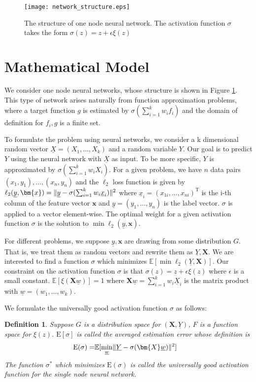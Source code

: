 \documentclass[conference]{IEEEtran}
\newtheorem{definition}{Definition}
\DeclarePairedDelimiter\norm{\lVert}{\rVert}
\def\E{\mathbb{E}}
\def\T{\mathrm{T}}
\begin{document}
\begin{figure}\label{fig:ns}
\texttt{[image: network\_structure.eps]}
\caption{The structure of one node neural network. The activation function $\sigma$ takes the form $\sigma(z)=z + \epsilon \xi(z)$}
\end{figure}

\section{Mathematical Model}\label{sec:mm}
We consider one node neural networks, whose structure is shown in Figure \ref{fig:ns}.
This type of network arises naturally from function approximation problems, where a target function $g$
is estimated by $\sigma(\sum_{i=1}^k w_i f_i)$ and the domain of definition for $f_i, g$ is a finite set.

To formulate the problem using neural networks, we consider a k dimensional random vector $\underline{X}=(X_1, \dots, X_k)$ and a random variable $Y$.
Our goal is to predict $Y$ using the neural network with $\underline{X}$ as input.
To be more specific, $Y$ is approximated by $ \sigma(\sum_{i=1}^k w_i X_i)$.
For a given problem, we have $n$ data pairs $(x_1, y_1), \dots, (x_n, y_n)$ and
the $\ell_2$ loss function is given by
$\ell_2(\underline{y}, \bm{x}) = \norm{\underline{y} - \sigma(\sum_{i=1}^k w_i \underline{x}_i)}^2 $
where $\underline{x}_i= (x_{1i}, \dots, x_{ni})^\T$ is the i-th column of the feature vector $\bm{x}$ and
$\underline{y} = (y_1, \dots, y_n)$ is the label vector. $\sigma$ is applied to a vector element-wise.
The optimal weight for a given activation function $\sigma$ is the solution to $\min \ell_2(\underline{y}, \bm{x})$.



For different problems, we suppose $\underline{y}, \bm{x}$ are drawing from some distribution $G$.
That is, we treat them as random vectors and rewrite them as $\underline{Y}, \bm{X}$.
We are interested to find a function $\sigma$ which minimizes
$\E[ \min \ell_2(\underline{Y}, \bm{X})]$.
Our constraint on the activation function $\sigma$ is that
$\sigma(z) = z + \epsilon \xi(z)$ where
$\epsilon$ is a small constant.
$\E[\xi(\bm{X}\underline{w})]=1$ where
$\bm{X}\underline{w} = \sum_{i=1}^k w_i \underline{X}_i$ is the matrix product with  $\underline{w}=(w_1, \dots, w_k)$.

We formulate the universally good activation function $\sigma$ as follows:
\begin{definition}\label{def:ug}
Suppose $G$ is a distribution space for $(\bm{X}, \underline{Y})$,
$F$ is a function space for $\xi(z)$.
$\mathrm{E}[\sigma]$ is called the averaged estimation error whose definition is
\begin{align}\label{eq:ug}
\mathrm{E}(\sigma) = & \E[ \min_{\underline{w}} \norm{\underline{Y} - \sigma(\bm{X} \underline{w})}^2] 
\end{align}
The function $\sigma^*$ which minimizes $\mathrm{E}(\sigma)$
is called the universally good activation function for the single node neural network.
\end{definition}
\end{document}
